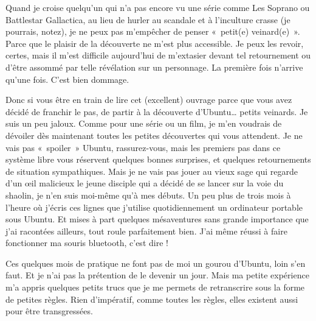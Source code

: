 Quand je croise quelqu'un qui n'a pas encore vu une série comme Les Soprano ou Battlestar Gallactica, au lieu de hurler au scandale et à l'inculture crasse (je pourrais, notez), je ne peux pas m'empêcher de penser «~petit(e) veinard(e)~». Parce que le plaisir de la découverte ne m'est plus accessible. Je peux les revoir, certes, mais il m'est difficile aujourd'hui de m'extasier devant tel retournement ou d'être assommé par telle révélation sur un personnage. La première fois n'arrive qu'une fois. C'est bien dommage.\par
Donc si vous être en train de lire cet (excellent) ouvrage parce que vous avez décidé de franchir le pas, de partir à la découverte d'Ubuntu\ldots{} petits veinards. Je suis un peu jaloux. Comme pour une série ou un film, je m'en voudrais de dévoiler dès maintenant toutes les petites découvertes qui vous attendent. Je ne vais pas «~spoiler~» Ubuntu, rassurez-vous, mais les premiers pas dans ce système libre vous réservent quelques bonnes surprises, et quelques retournements de situation sympathiques. Mais je ne vais pas jouer au vieux sage qui regarde d'un œil malicieux le jeune disciple qui a décidé de se lancer sur la voie du shaolin, je n'en suis moi-même qu'à mes débuts. Un peu plus de trois mois à l'heure où j'écris ces lignes que j'utilise quotidiennement un ordinateur portable sous Ubuntu. Et mises à part quelques mésaventures sans grande importance que j'ai racontées ailleurs, tout roule parfaitement bien. J'ai même réussi à faire fonctionner ma souris bluetooth, c'est dire !\par
Ces quelques mois de pratique ne font pas de moi un gourou d'Ubuntu, loin s'en faut. Et je n'ai pas la prétention de le devenir un jour. Mais ma petite expérience m'a appris quelques petits trucs que je me permets de retranscrire sous la forme de petites règles. Rien d'impératif, comme toutes les règles, elles existent aussi pour être transgressées.\par

